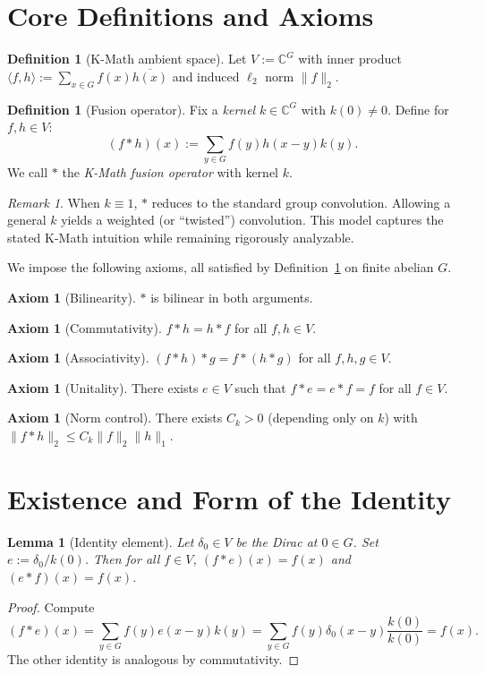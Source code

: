 \documentclass[11pt]{article}
\theoremstyle{plain}
\newtheorem{lemma}[theorem]{Lemma}
\theoremstyle{definition}
\newtheorem{definition}[theorem]{Definition}
\newtheorem{axiom}[theorem]{Axiom}
\theoremstyle{remark}
\newtheorem{remark}[theorem]{Remark}
\begin{document}
\section{Core Definitions and Axioms}
\begin{definition}[K-Math ambient space]
Let $V := \mathbb{C}^G$ with inner product $\langle f, h \rangle := \sum_{x \in G} f(x) \overline{h(x)}$ and induced $\ell_2$ norm $\lVert f \rVert_2$.
\end{definition}
\begin{definition}[Fusion operator]\label{def:fusion}
Fix a \emph{kernel} $k \in \mathbb{C}^G$ with $k(0) \neq 0$. Define for $f,h \in V$:
\[
    (f \ast h)(x) := \sum_{y \in G} f(y) h(x - y) k(y).
\]
We call $\ast$ the \emph{K-Math fusion operator} with kernel $k$.
\end{definition}
\begin{remark}
When $k \equiv 1$, $\ast$ reduces to the standard group convolution. Allowing a general $k$ yields a weighted (or ``twisted'') convolution. This model captures the stated K-Math intuition while remaining rigorously analyzable.
\end{remark}
We impose the following axioms, all satisfied by Definition~\ref{def:fusion} on finite abelian $G$.
\begin{axiom}[Bilinearity] $\ast$ is bilinear in both arguments.
\end{axiom}
\begin{axiom}[Commutativity] $f \ast h = h \ast f$ for all $f,h \in V$.
\end{axiom}
\begin{axiom}[Associativity] $(f \ast h) \ast g = f \ast (h \ast g)$ for all $f,h,g \in V$.
\end{axiom}
\begin{axiom}[Unitality] There exists $e \in V$ such that $f \ast e = e \ast f = f$ for all $f \in V$.
\end{axiom}
\begin{axiom}[Norm control] There exists $C_k > 0$ (depending only on $k$) with $\lVert f \ast h \rVert_2 \le C_k \lVert f \rVert_2 \lVert h \rVert_1$.
\end{axiom}
\section{Existence and Form of the Identity}
\begin{lemma}[Identity element]\label{lem:identity}
Let $\delta_0 \in V$ be the Dirac at $0 \in G$. Set $e := \delta_0 / k(0)$. Then for all $f \in V$, $(f \ast e)(x) = f(x)$ and $(e \ast f)(x) = f(x)$.
\end{lemma}
\begin{proof}
Compute
\[
    (f \ast e)(x) = \sum_{y \in G} f(y) e(x - y) k(y) = \sum_{y \in G} f(y) \delta_0(x - y) \frac{k(0)}{k(0)} = f(x).
\]
The other identity is analogous by commutativity.
\end{proof}
\end{document}

